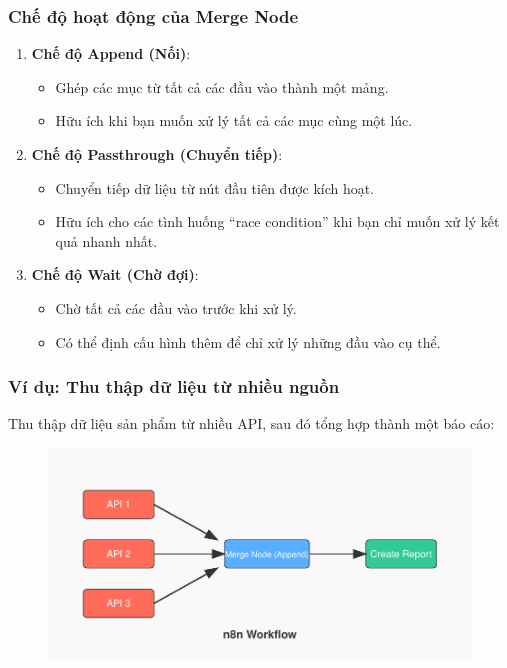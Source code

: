 \subsubsection{Chế độ hoạt động của Merge Node}

\begin{enumerate}
  \item \textbf{Chế độ Append (Nối)}:
  \begin{itemize}
    \item Ghép các mục từ tất cả các đầu vào thành một mảng.
    \item Hữu ích khi bạn muốn xử lý tất cả các mục cùng một lúc.
  \end{itemize}

  \item \textbf{Chế độ Passthrough (Chuyển tiếp)}:
  \begin{itemize}
    \item Chuyển tiếp dữ liệu từ nút đầu tiên được kích hoạt.
    \item Hữu ích cho các tình huống ``race condition'' khi bạn chỉ muốn xử lý kết quả nhanh nhất.
  \end{itemize}

  \item \textbf{Chế độ Wait (Chờ đợi)}:
  \begin{itemize}
    \item Chờ tất cả các đầu vào trước khi xử lý.
    \item Có thể định cấu hình thêm để chỉ xử lý những đầu vào cụ thể.
  \end{itemize}
\end{enumerate}

\subsubsection{Ví dụ: Thu thập dữ liệu từ nhiều nguồn}

Thu thập dữ liệu sản phẩm từ nhiều API, sau đó tổng hợp thành một báo cáo:

\begin{figure}[htbp]
    \centering
    \includegraphics[width=1\linewidth]{Chap1-7/merge.pdf}
\end{figure}

